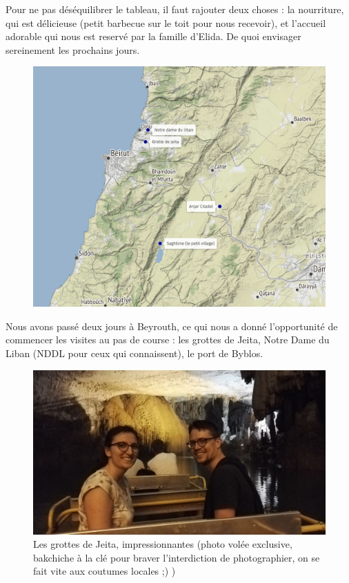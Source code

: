 Pour ne pas déséquilibrer le tableau, il faut rajouter deux choses : la
nourriture, qui est délicieuse (petit barbecue sur le toit pour nous
recevoir), et l'accueil adorable qui nous est reservé par la famille
d'Elida. De quoi envisager sereinement les prochains jours.

\begin{figure}
\centering
\includegraphics{maps/Liban1.png}
\end{figure}

Nous avons passé deux jours à Beyrouth, ce qui nous a donné
l'opportunité de commencer les visites au pas de course : les grottes de
Jeita, Notre Dame du Liban (NDDL pour ceux qui connaissent), le port de
Byblos.

\begin{figure}
\centering
\includegraphics{images/20180506_Jeita.jpg}
\caption{Les grottes de Jeita, impressionnantes (photo volée exclusive,
bakchiche à la clé pour braver l'interdiction de photographier, on se
fait vite aux coutumes locales ;) )}
\end{figure}


